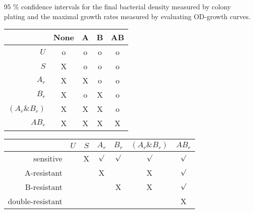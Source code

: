 \begin{table}[H]
  \centering
  \caption{95 \% confidence intervals for the final bacterial density measured by colony plating and the maximal growth rates measured by evaluating OD-growth curves.}
  \label{tab:growth_and_density}
  
\end{table}

\begin{table}[H]
  \centering
  \begin{minipage}[t]{0.5\textwidth}
    \centering
    \begin{tabular}{r|cccc}
      \toprule
      & None & A & B & AB  \\
      \midrule
      $U$   & o & o & o & o \\
      $S$   & X &o&o&o\\
      $A_r$   & X & X &o&o\\
      $B_r$   & X &o& X &o\\
      $(A_r\&B_r)$   & X & X & X &o\\
      $AB_r$   & X & X & X & X \\
      \bottomrule
    \end{tabular}
    \label{tab:phenotyping}
  \end{minipage}
\end{table}

\begin{table}[H]
  \centering
  \begin{minipage}[t]{0.55\textwidth}
    \centering
    \begin{tabular}{r|cccccc}
      \toprule
      & $U$ & $S$ & $A_r$ & $B_r$ & $(A_r\&B_r)$ & $AB_r$ \\
      \midrule
      sensitive     &  & X &  $\surd$ &   $\surd$ &  $\surd$ &  $\surd$ \\
      A-resistant   & &  & X  &   & X  &  $\surd$ \\
      B-resistant   & & & & X  & X  &  $\surd$  \\
      double-resistant  & &  &  & & & X  \\
      \bottomrule
    \end{tabular}
    \label{tab:bacterial-phenotypes}
  \end{minipage}
\end{table}

